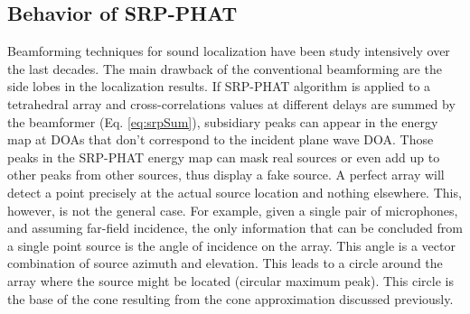 \subsection{Behavior of SRP-PHAT}

Beamforming techniques for sound localization have been study intensively over the last decades. The main drawback of the conventional beamforming are the side lobes in the localization results. If SRP-PHAT algorithm is applied to a tetrahedral array and cross-correlations values at different delays are summed by the beamformer (Eq. \ref{eq:srpSum}), subsidiary peaks can appear in the energy map at DOAs that don't correspond to the incident plane wave DOA. Those peaks in the SRP-PHAT energy map can mask real sources or even add up to other peaks from other sources, thus display a fake source. 
A perfect array will detect a point precisely at the actual source location and nothing elsewhere. This, however, is not the general case. For example, given a single pair of microphones, and assuming far-field incidence, the only information that can be concluded from a single point source is the angle of incidence on the array. This angle is a vector combination of source azimuth and elevation. This leads to a circle around the array where the source might be located (circular maximum peak). This circle is the base of the cone resulting from the cone approximation discussed previously.
